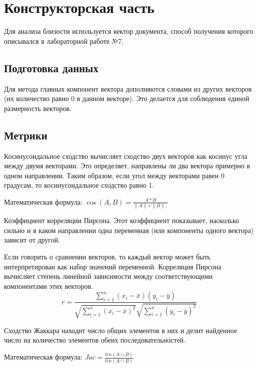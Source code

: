 \chapter{Конструкторская часть}

Для анализа близости используется вектор документа, способ получения которого описывался в лабораторной работе №7. 

\section{Подготовка данных}

Для метода главных компонент вектора дополняются словами из других векторов (их количество равно 0 в данном векторе).
Это делается для соблюдения единой размерность векторов.

\section{Метрики}

Косинусоидальное сходство вычисляет сходство двух векторов как косинус угла между двумя векторами. Это определяет,
направлены ли два вектора примерно в одном направлении. Таким образом, если угол между векторами равен 0 градусам, то косинусоидальное сходство равно 1.

Математическая формула: 
\begin{math}
    \label{cos_sim}
    \cos(A, B) = \frac{A * B}{\| A \| \times \| B \|,}
\end{math}
\cite{cosine}

Коэффициент корреляции Пирсона. Этот коэффициент показывает, насколько сильно и в каком направлении 
одна переменная (или компоненты одного вектора) зависит от другой.

Если говорить о сравнении векторов, то каждый вектор может быть интерпретирован как набор значений переменной. 
Корреляция Пирсона вычисляет степень линейной зависимости между соответствующими компонентами этих векторов.
\cite{lib:pearson}
\begin{equation}
    \label{pearson}
    r = \frac{\sum_{i=1}^{n} (x_i - \bar{x})(y_i - \bar{y})}{\sqrt{\sum_{i=1}^{n} (x_i - \bar{x})^2} \sqrt{\sum_{i=1}^{n} (y_i - \bar{y})^2}}
\end{equation}

Сходство Жаккара находит число общих элементов в них и делит найденное число на количество элементов обеих последовательностей.

Математическая формула: 
\begin{math}
    \label{jac_sim}
    Jac = \frac{len(A \cup B)}{len(A \cap B)}
\end{math}

